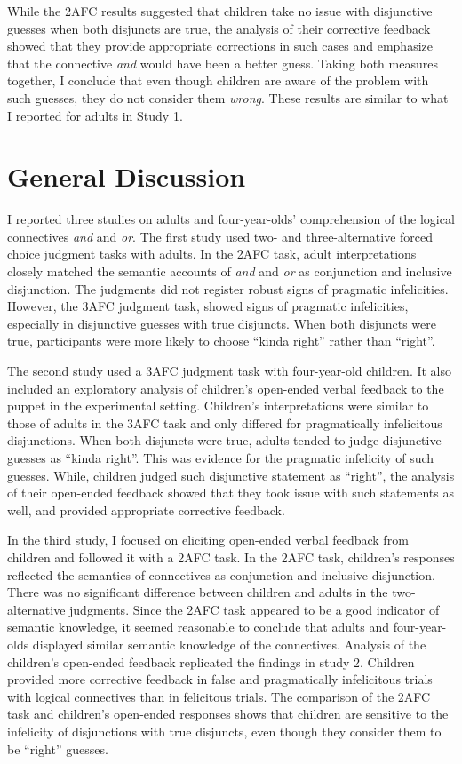 \documentclass[oneside]{report}
\theoremstyle{definition}
\theoremstyle{definition}
\theoremstyle{definition}
\theoremstyle{remark}
\begin{document}
While the 2AFC results suggested that children take no issue with
disjunctive guesses when both disjuncts are true, the analysis of their
corrective feedback showed that they provide appropriate corrections in
such cases and emphasize that the connective \emph{and} would have been
a better guess. Taking both measures together, I conclude that even
though children are aware of the problem with such guesses, they do not
consider them \emph{wrong}. These results are similar to what I reported
for adults in Study 1.

\section{General Discussion}\label{general-discussion}

I reported three studies on adults and four-year-olds' comprehension of
the logical connectives \emph{and} and \emph{or}. The first study used
two- and three-alternative forced choice judgment tasks with adults. In
the 2AFC task, adult interpretations closely matched the semantic
accounts of \emph{and} and \emph{or} as conjunction and inclusive
disjunction. The judgments did not register robust signs of pragmatic
infelicities. However, the 3AFC judgment task, showed signs of pragmatic
infelicities, especially in disjunctive guesses with true disjuncts.
When both disjuncts were true, participants were more likely to choose
``kinda right'' rather than ``right''.

The second study used a 3AFC judgment task with four-year-old children.
It also included an exploratory analysis of children's open-ended verbal
feedback to the puppet in the experimental setting. Children's
interpretations were similar to those of adults in the 3AFC task and
only differed for pragmatically infelicitous disjunctions. When both
disjuncts were true, adults tended to judge disjunctive guesses as
``kinda right''. This was evidence for the pragmatic infelicity of such
guesses. While, children judged such disjunctive statement as ``right'',
the analysis of their open-ended feedback showed that they took issue
with such statements as well, and provided appropriate corrective
feedback.

In the third study, I focused on eliciting open-ended verbal feedback
from children and followed it with a 2AFC task. In the 2AFC task,
children's responses reflected the semantics of connectives as
conjunction and inclusive disjunction. There was no significant
difference between children and adults in the two-alternative judgments.
Since the 2AFC task appeared to be a good indicator of semantic
knowledge, it seemed reasonable to conclude that adults and
four-year-olds displayed similar semantic knowledge of the connectives.
Analysis of the children's open-ended feedback replicated the findings
in study 2. Children provided more corrective feedback in false and
pragmatically infelicitous trials with logical connectives than in
felicitous trials. The comparison of the 2AFC task and children's
open-ended responses shows that children are sensitive to the infelicity
of disjunctions with true disjuncts, even though they consider them to
be ``right'' guesses.
\end{document}
